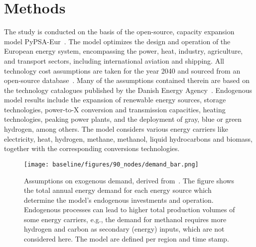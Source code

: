 \documentclass[twocolumn]{article}
\begin{document}
\section*{Methods}
\label{sec:methodology}

The study is conducted on the basis of the open-source, capacity expansion model PyPSA-Eur~\cite{horschPyPSAEurOpenOptimisation2018,brownSynergiesSectorCoupling2018,PyPSAEurSecSectorCoupledOpen2023}.
The model optimizes the design and operation of the European energy system, encompassing the power, heat, industry, agriculture, and transport sectors, including international aviation and shipping.
All technology cost assumptions are taken for the year 2040 and sourced from an open-source database~\cite{lisazeyenPyPSATechnologydataTechnology2023}.
Many of the assumptions contained therein are based on the technology catalogues published by the Danish Energy Agency~\cite{danishenergyagencyTechnologyDataGeneration2019,thedanishenergyagencyTechnologyDataCarbon2023}.
Endogenous model results include the expansion of renewable energy sources, storage technologies, power-to-X conversion and transmission capacities, heating technologies, peaking power plants, and the deployment of gray, blue or green hydrogen, among others.
The model considers various energy carriers like electricity, heat, hydrogen, methane, methanol, liquid hydrocarbons and biomass, together with the corresponding conversions technologies.

\begin{figure}
    \texttt{[image: baseline/figures/90\_nodes/demand\_bar.png]}
    \caption{Assumptions on exogenous demand, derived from~\cite{piamanzGeoreferencedIndustrialSites2018,muehlenpfordtTimeSeries2019,mantzosJRCIDEES20152018,NationalEmissionsReported2023,EurostatCompleteEnergyBalance,uwekrienDemandlib2023}. The figure shows the total annual energy demand for each energy source which determine the model's endogenous investments and operation. Endogenous processes can lead to higher total production volumes of some energy carriers, e.g., the demand for methanol requires more hydrogen and carbon as secondary (energy) inputs, which are not considered here. The model are defined per region and time stamp.}
    \label{fig:total-demand-bar}
\end{figure}

\end{document}

